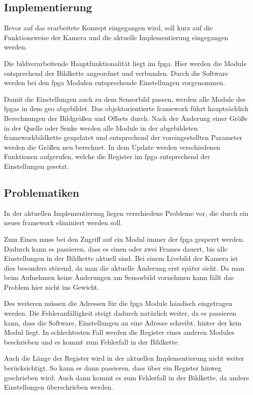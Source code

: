 \subsection{Implementierung}
Bevor auf das erarbeitete Konzept eingegangen wird, soll kurz auf die Funktionsweise der Kamera und die aktuelle Implementierung eingegangen werden.

Die bildverarbeitende Hauptfunktionalität liegt im \ac{fpga}. Hier werden die Module entsprechend der Bildkette angeordnet und verbunden. Durch die Software werden bei den \ac{fpga} Modulen entsprechende Einstellungen vorgenommen.

Damit die Einstellungen auch zu dem Sensorbild passen, werden alle Module des \ac{fpga}s in dem \ac{geo} abgebildet. Das objektorientierte \gls{framework} führt hauptsächlich Berechnungen der Bildgrößen und Offsets durch. Nach der Änderung einer Größe in der Quelle oder Senke werden alle Module in der abgebildeten \gls{framework}bildkette geupdatet und entsprechend der voreingestellten Parameter werden die Größen neu berechnet. In dem Update werden verschiedenen Funktionen aufgerufen, welche die Register im \ac{fpga} entsprechend der Einstellungen gesetzt.

\subsection{Problematiken}\label{sec:prob}
In der aktuellen Implementierung liegen verschiedene Probleme vor, die durch ein neues \gls{framework} eliminiert werden soll.

Zum Einen muss bei den Zugriff auf ein Modul immer der \ac{fpga} gesperrt werden. Dadurch kann es passieren, dass es einen oder zwei Frames dauert, bis alle Einstellungen in der Bildkette aktuell sind. Bei einem Livebild der Kamera ist dies besonders störend, da man die aktuelle Änderung erst später sieht. Da man beim Aufnehmen keine Änderungen am Sensorbild vornehmen kann fällt das Problem hier nicht ins Gewicht.

Des weiteren müssen die Adressen für die \ac{fpga} Module händisch eingetragen werden. Die Fehleranfälligkeit steigt dadurch natürlich weiter, da es passieren kann, dass die Software, Einstellungen an eine Adresse schreibt, hinter der kein Modul liegt. In schlechtesten Fall werden die Register eines anderen Modules beschrieben und es kommt zum Fehlerfall in der Bildkette.

Auch die Länge der Register wird in der aktuellen Implementierung nicht weiter berücksichtigt. So kann es dann passieren, dass über ein Register hinweg geschrieben wird. Auch dann kommt es zum Fehlerfall in der Bildkette, da andere Einstellungen überschrieben werden. 

